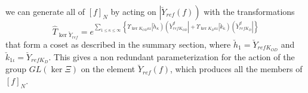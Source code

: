 we can generate all of $\left[ f\right] _{N}$ by acting on $\left| \breve{Y}%
_{ref}\left( f\right) \right) $ with the transformations 
\begin{equation}
\hat{T}_{\ker \breve{Y}_{ref}}=e^{\sum_{1\leq \kappa \leq \infty }\left\{
\Upsilon _{\ker K_{OD}\kappa \iota }\left| \breve{h}_{\kappa }\right) \left( 
\breve{Y}_{refK_{OD}}^{d}\right| +\Upsilon _{\ker K_{D}\kappa \iota }\left| 
\breve{k}_{\kappa }\right) \left( \breve{Y}_{refK_{D}}^{d}\right| \right\} }
\label{parker}
\end{equation}%
that form a coset as described in the summary section, where $\breve{h}_{1}=%
\breve{Y}_{refK_{OD}}$ and $\breve{k}_{1\iota }=\breve{Y}_{refK_{D}}$. This
gives a non redundant parameterization for the action of the group $GL\left(
\ker \Xi \right) $ on the element $\breve{Y}_{ref}\left( f\right) $, which
produces all the members of $\left[ f\right] _{N}$.

